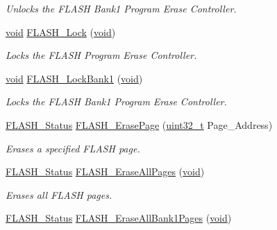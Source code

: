 \begin{DoxyCompactItemize}
\begin{DoxyCompactList}\small\item\em Unlocks the F\+L\+A\+SH Bank1 Program Erase Controller. \end{DoxyCompactList}\item 
\hyperlink{usb__devapi_8h_afabf60e7f57651d6d595a02c75f07cd0}{void} \hyperlink{group___f_l_a_s_h___private___functions_ga46899557353c4312ddbe3f25e65df1d8}{F\+L\+A\+S\+H\+\_\+\+Lock} (\hyperlink{usb__devapi_8h_afabf60e7f57651d6d595a02c75f07cd0}{void})
\begin{DoxyCompactList}\small\item\em Locks the F\+L\+A\+SH Program Erase Controller. \end{DoxyCompactList}\item 
\hyperlink{usb__devapi_8h_afabf60e7f57651d6d595a02c75f07cd0}{void} \hyperlink{group___f_l_a_s_h___private___functions_gafe4188ab9eb12c046970660f65a3faf9}{F\+L\+A\+S\+H\+\_\+\+Lock\+Bank1} (\hyperlink{usb__devapi_8h_afabf60e7f57651d6d595a02c75f07cd0}{void})
\begin{DoxyCompactList}\small\item\em Locks the F\+L\+A\+SH Bank1 Program Erase Controller. \end{DoxyCompactList}\item 
\hyperlink{group___f_l_a_s_h___exported___types_gadc63a6f3404ff1f71229a66915e9cdc0}{F\+L\+A\+S\+H\+\_\+\+Status} \hyperlink{group___f_l_a_s_h___private___functions_ga13a2ca18bfb3d5fb827a2751799f8451}{F\+L\+A\+S\+H\+\_\+\+Erase\+Page} (\hyperlink{_p_e___types_8h_a33594304e786b158f3fb30289278f5af}{uint32\+\_\+t} Page\+\_\+\+Address)
\begin{DoxyCompactList}\small\item\em Erases a specified F\+L\+A\+SH page. \end{DoxyCompactList}\item 
\hyperlink{group___f_l_a_s_h___exported___types_gadc63a6f3404ff1f71229a66915e9cdc0}{F\+L\+A\+S\+H\+\_\+\+Status} \hyperlink{group___f_l_a_s_h___private___functions_gab2e6dea62c72b3e47c17512579d37498}{F\+L\+A\+S\+H\+\_\+\+Erase\+All\+Pages} (\hyperlink{usb__devapi_8h_afabf60e7f57651d6d595a02c75f07cd0}{void})
\begin{DoxyCompactList}\small\item\em Erases all F\+L\+A\+SH pages. \end{DoxyCompactList}\item 
\hyperlink{group___f_l_a_s_h___exported___types_gadc63a6f3404ff1f71229a66915e9cdc0}{F\+L\+A\+S\+H\+\_\+\+Status} \hyperlink{group___f_l_a_s_h___private___functions_ga2036728450ee18e789b25fe3fd9c80ee}{F\+L\+A\+S\+H\+\_\+\+Erase\+All\+Bank1\+Pages} (\hyperlink{usb__devapi_8h_afabf60e7f57651d6d595a02c75f07cd0}{void})

\end{DoxyCompactItemize}
